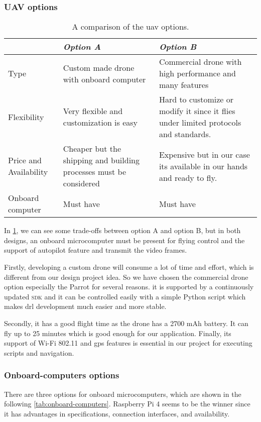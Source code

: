 \documentclass[../main.tex]{subfiles}
\begin{document}
\subsubsection{UAV options}
\begin{table}[H]
	\centering
	\caption{A comparison of the \gls{uav} options.}
	\label{tab:alt-solutions}
	\begin{tabularx}{\textwidth}{ p{4cm} X X }
		\toprule
		\textit{} & \textit{Option A} & \textit{Option B}\\ \midrule
		Type  & Custom made drone with onboard computer & 
		Commercial drone with high performance and many features    \\
		Flexibility & Very flexible and customization is easy & 
		Hard to customize or modify it since it flies under 
		limited protocols and standards. \\
		
		Price and Availability & Cheaper but the shipping and 
		building processes must be considered & Expensive but 
		in our case its available in our hands and ready to fly.   \\
		
		Onboard computer & Must have & Must have \\
		\bottomrule
	\end{tabularx}
\end{table} 

In \cref{tab:alt-solutions}, 
we can see some trade-offs 
between option A and option B, but in both designs, 
an onboard microcomputer must be present for 
flying control and the support of autopilot feature and 
transmit the video frames. 


Firstly, developing a custom drone will consume a lot of time and effort, 
which is different from our design project idea.
So we have chosen the commercial drone option especially 
the Parrot \anafi for several reasons.
it is supported by a continuously updated 
\textsc{sdk} and it can be controlled easily 
with a simple Python script which makes 
\gls{drl} development much easier and more stable. 

Secondly, it has a good flight time 
as the \anafi drone has a 2700 mAh battery. 
It can fly up to 25 minutes which is good enough 
for our application.
Finally, its support of Wi-Fi 802.11 and \gls{gps} 
features is essential in our project for 
executing scripts and navigation.

\subsubsection{Onboard-computers options}
There are three options for onboard microcomputers, 
which are shown in the following 
\cref{tab:onboard-computers}. Raspberry Pi 4 seems 
to be the winner since it has advantages 
in specifications, connection interfaces, 
and availability.
\end{document}
